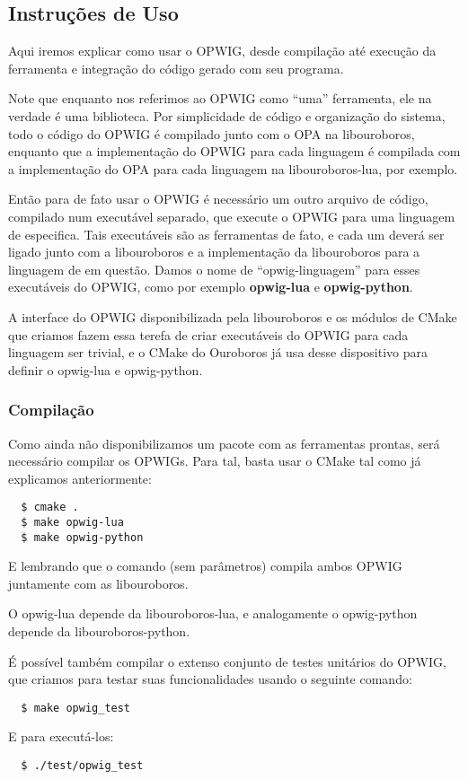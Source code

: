 \subsection{Instruções de Uso}
Aqui iremos explicar como usar o OPWIG, desde compilação até execução da ferramenta
e integração do código gerado com seu programa.

Note que enquanto nos referimos ao OPWIG como ``uma'' ferramenta, ele na verdade
é uma biblioteca. Por simplicidade de código e organização do sistema, 
todo o código do OPWIG é compilado junto com o OPA na libouroboros, enquanto que 
a implementação do OPWIG para cada linguagem é compilada com a implementação do
OPA para cada linguagem na libouroboros-lua, por exemplo.

Então para de fato usar o OPWIG é necessário um outro arquivo de código, compilado
num executável separado, que execute o OPWIG para uma linguagem de \script{} especifica.
Tais executáveis são as ferramentas de fato, e cada um deverá ser ligado junto com a
libouroboros e a implementação da libouroboros para a linguagem de \script{} em questão. 
Damos o nome de ``opwig-linguagem'' para esses executáveis do OPWIG, como por exemplo
\textbf{opwig-lua} e \textbf{opwig-python}.

A interface do OPWIG disponibilizada pela libouroboros e os módulos de CMake
que criamos fazem essa terefa de criar executáveis do OPWIG para cada linguagem ser trivial,
e o CMake do Ouroboros já usa desse dispositivo para definir o opwig-lua e opwig-python.

\subsubsection{Compilação}
Como ainda não disponibilizamos um pacote com as ferramentas prontas, será necessário
compilar os OPWIGs. Para tal, basta usar o CMake tal como já explicamos anteriormente:
\begin{verbatim}
  $ cmake .
  $ make opwig-lua
  $ make opwig-python
\end{verbatim}
E lembrando que o comando  (sem parâmetros) compila ambos OPWIG juntamente com
as libouroboros.

O opwig-lua depende da libouroboros-lua, e analogamente o opwig-python depende da libouroboros-python.

É possível também compilar o extenso conjunto de testes unitários do OPWIG, que
criamos para testar suas funcionalidades usando o seguinte comando:
\begin{verbatim}
  $ make opwig_test
\end{verbatim}
E para executá-los:
\begin{verbatim}
  $ ./test/opwig_test
\end{verbatim}

